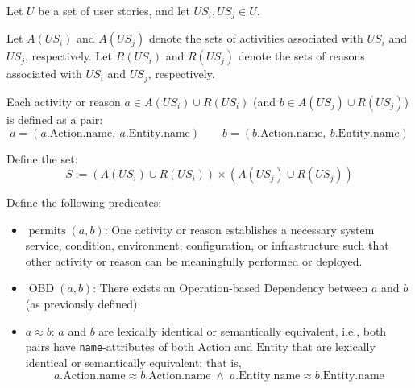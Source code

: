 \documentclass[a4paper, 11 pt, leqno, titlepage = true, toc=bib, oneside]{scrbook}
\begin{document}
\begin{defin}
    Let $U$ be a set of user stories, and let $US_i, US_j \in U$.

    Let $A(US_i)$ and $A(US_j)$ denote the sets of activities associated with $US_i$ and $US_j$, respectively.
    Let $R(US_i)$ and $R(US_j)$ denote the sets of reasons associated with $US_i$ and $US_j$, respectively.

    Each activity or reason $a \in A(US_i) \cup R(US_i)$ (and $b \in A(US_j) \cup R(US_j)$) is defined as a pair:
    \[
        a = (a.\text{Action.name},\ a.\text{Entity.name})
        \qquad
        b = (b.\text{Action.name},\ b.\text{Entity.name})
    \]

    Define the set:
    \[
        S := (A(US_i) \cup R(US_i)) \times (A(US_j) \cup R(US_j))
    \]


    Define the following predicates:
    \begin{itemize}
        \item $\operatorname{permits}(a, b)$: One activity or reason establishes a necessary system service, condition, environment, configuration, or infrastructure such that other activity or reason can be meaningfully performed or deployed.
        \item $\operatorname{OBD}(a, b)$: There exists an Operation-based Dependency between $a$ and $b$ (as previously defined).
        \item $a \approx b$: $a$ and $b$ are lexically identical or semantically equivalent, i.e., both pairs have \texttt{name}-attributes of both $\text{Action}$ and $\text{Entity}$ that are lexically identical or semantically equivalent; that is, \[
                  a.\text{Action.name} \approx b.\text{Action.name} \;\land\; a.\text{Entity.name} \approx b.\text{Entity.name}
              \]
    \end{itemize}


\end{defin}
\end{document}
